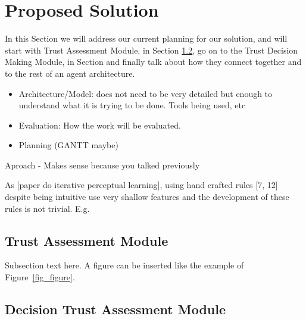 \section{Proposed Solution}
\label{sec:Solution}
In this Section we will address our current planning for our solution, and will start with Trust Assessment Module, in Section \ref{subsec:Solution:Trust Assessment Module}, go on to the Trust Decision Making Module, in Section and finally talk about how they connect together and to the rest of an agent architecture.



\begin{itemize}
	\item Architecture/Model: does not need to be very detailed but enough to understand what it is trying to be done. Tools being used, etc
	\item Evaluation: How the work will be evaluated.	
	\item Planning (GANTT maybe)	
\end{itemize}Aproach - Makes sense because you talked previously


As [paper do iterative perceptual learning], using hand crafted rules [7, 12] despite being intuitive use very shallow features and the development of these rules is not trivial.
E.g.

\subsection{Trust Assessment Module}
\label{subsec:Solution:Trust Assessment Module}
Subsection text here.
A figure can be inserted like the example of Figure~\ref{fig_figure}.


\subsection{Decision Trust Assessment Module}
\label{subsec:Solution:Trust Assessment Module}